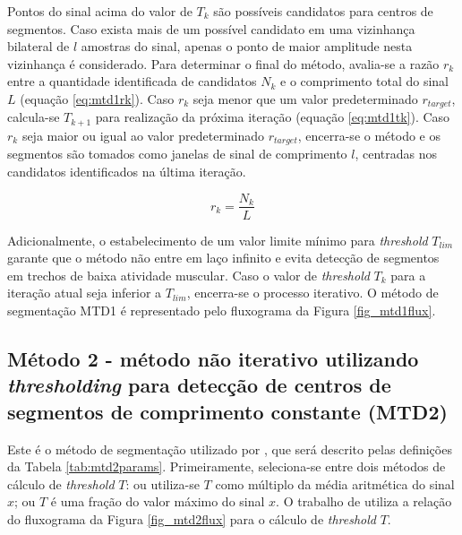 Pontos do sinal acima do valor de $T_k$ são possíveis candidatos para centros de segmentos. Caso exista mais de um possível candidato em uma vizinhança bilateral de $l$ amostras do sinal, apenas o ponto de maior amplitude nesta vizinhança é considerado. Para determinar o final do método, avalia-se a razão $r_k$ entre a quantidade identificada de candidatos $N_{k}$ e o comprimento total do sinal $L$ (equação \ref{eq:mtd1rk}). Caso $r_k$ seja menor que um valor predeterminado $r_{target}$, calcula-se $T_{k+1}$ para realização da próxima iteração (equação \ref{eq:mtd1tk}). Caso $r_k$ seja maior ou igual ao valor predeterminado $r_{target}$, encerra-se o método e os segmentos são tomados como janelas de sinal de comprimento $l$, centradas nos candidatos identificados na última iteração.

\begin{equation}
\label{eq:mtd1rk}
  r_k = \frac{N_{k}}{L} 
\end{equation}

Adicionalmente, o estabelecimento de um valor limite mínimo para \emph{threshold} $T_{lim}$ garante que o método não entre em laço infinito e evita detecção de segmentos em trechos de baixa atividade muscular. Caso o valor de \emph{threshold} $T_k$ para a iteração atual seja inferior a $T_{lim}$, encerra-se o processo iterativo. O método de segmentação MTD1 é representado pelo fluxograma da Figura \ref{fig_mtd1flux}.



			\subsection{Método 2 - método não iterativo utilizando \emph{thresholding} para detecção de centros de segmentos de comprimento constante (MTD2)}
Este é o método de segmentação utilizado por \cite{Katsis2006}, que será descrito pelas definições da Tabela \ref{tab:mtd2params}. Primeiramente, seleciona-se entre dois métodos de cálculo de \emph{threshold} $T$: ou utiliza-se $T$ como múltiplo da média aritmética do sinal $x$; ou $T$ é uma fração do valor máximo do sinal $x$. O trabalho de \cite{Katsis2006} utiliza a relação do fluxograma da Figura \ref{fig_mtd2flux} para o cálculo de \emph{threshold} $T$.



